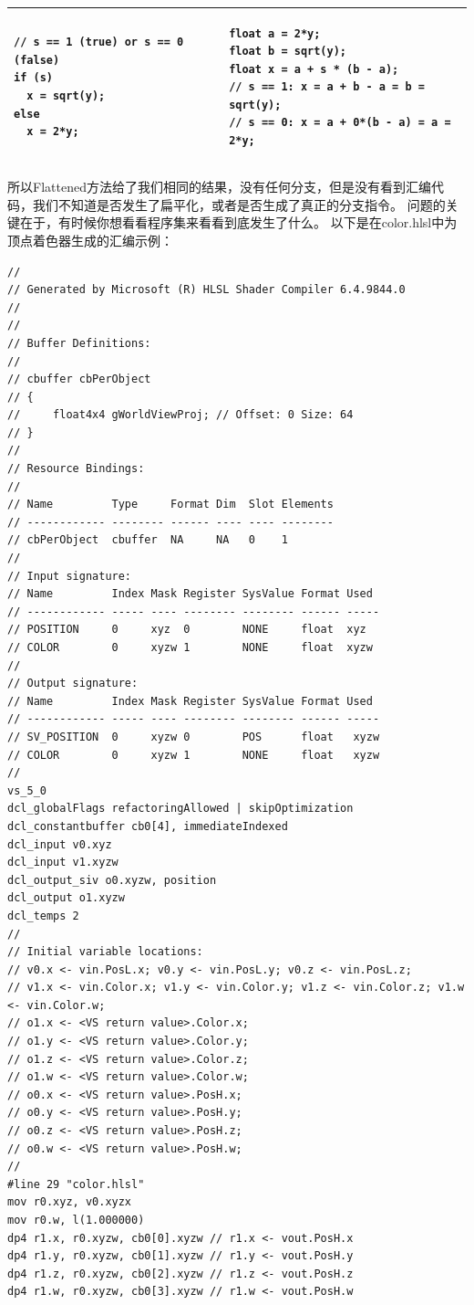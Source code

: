 \documentclass[11pt,a4paper,oldfontcommands]{memoir}
\begin{document}
{\begin{flushleft}
\begin{tabular}{|p{20em}|p{20em}|}
\begin{lstlisting}
// s == 1 (true) or s == 0 (false)
if (s)
  x = sqrt(y);
else
  x = 2*y;
\end{lstlisting}
&
\begin{lstlisting}
float a = 2*y;
float b = sqrt(y);
float x = a + s * (b - a);
// s == 1: x = a + b - a = b = sqrt(y);
// s == 0: x = a + 0*(b - a) = a = 2*y;
\end{lstlisting}\\
\hline
\end{tabular}
所以Flattened方法给了我们相同的结果，没有任何分支，但是没有看到汇编代码，我们不知道是否发生了扁平化，或者是否生成了真正的分支指令。 问题的关键在于，有时候你想看看程序集来看看到底发生了什么。 以下是在color.hlsl中为顶点着色器生成的汇编示例：\\
\begin{lstlisting}
//
// Generated by Microsoft (R) HLSL Shader Compiler 6.4.9844.0
//
//
// Buffer Definitions:
//
// cbuffer cbPerObject
// {
//     float4x4 gWorldViewProj; // Offset: 0 Size: 64
// }
//
// Resource Bindings:
//
// Name         Type     Format Dim  Slot Elements
// ------------ -------- ------ ---- ---- --------
// cbPerObject  cbuffer  NA     NA   0    1
//
// Input signature:
// Name         Index Mask Register SysValue Format Used
// ------------ ----- ---- -------- -------- ------ -----
// POSITION     0     xyz  0        NONE     float  xyz
// COLOR        0     xyzw 1        NONE     float  xyzw
//
// Output signature:
// Name         Index Mask Register SysValue Format Used
// ------------ ----- ---- -------- -------- ------ -----
// SV_POSITION  0     xyzw 0        POS      float   xyzw
// COLOR        0     xyzw 1        NONE     float   xyzw
//
vs_5_0
dcl_globalFlags refactoringAllowed | skipOptimization
dcl_constantbuffer cb0[4], immediateIndexed
dcl_input v0.xyz
dcl_input v1.xyzw
dcl_output_siv o0.xyzw, position
dcl_output o1.xyzw
dcl_temps 2
//
// Initial variable locations:
// v0.x <- vin.PosL.x; v0.y <- vin.PosL.y; v0.z <- vin.PosL.z;
// v1.x <- vin.Color.x; v1.y <- vin.Color.y; v1.z <- vin.Color.z; v1.w <- vin.Color.w;
// o1.x <- <VS return value>.Color.x;
// o1.y <- <VS return value>.Color.y;
// o1.z <- <VS return value>.Color.z;
// o1.w <- <VS return value>.Color.w;
// o0.x <- <VS return value>.PosH.x;
// o0.y <- <VS return value>.PosH.y;
// o0.z <- <VS return value>.PosH.z;
// o0.w <- <VS return value>.PosH.w;
//
#line 29 "color.hlsl"
mov r0.xyz, v0.xyzx
mov r0.w, l(1.000000)
dp4 r1.x, r0.xyzw, cb0[0].xyzw // r1.x <- vout.PosH.x
dp4 r1.y, r0.xyzw, cb0[1].xyzw // r1.y <- vout.PosH.y
dp4 r1.z, r0.xyzw, cb0[2].xyzw // r1.z <- vout.PosH.z
dp4 r1.w, r0.xyzw, cb0[3].xyzw // r1.w <- vout.PosH.w


\end{lstlisting}
\end{flushleft}}
\end{document}
